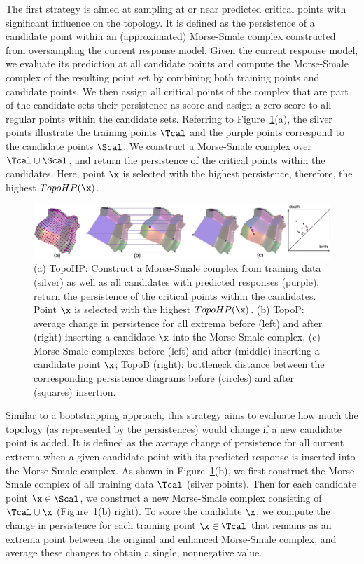  The first strategy is aimed at sampling at or near predicted critical points with significant influence on the topology.
%
It is defined as the persistence of a candidate point within an (approximated) Morse-Smale complex constructed from oversampling the current response model.
%
Given the current response model, we evaluate its prediction at all candidate points and compute the Morse-Smale complex of the resulting point set by combining both training points and candidate points.
%
We then assign all critical points of the complex that are part of the candidate sets their persistence as score and assign a zero score to all regular points within the candidate sets.
%
Referring to Figure~\ref{fig:topo-all}(a), the silver points illustrate the training points $\Tcal$ and the purple points correspond to the candidate points $\Scal$.
%
We construct a Morse-Smale complex over $\Tcal \cup \Scal$, and return the persistence of the critical points within the candidates.
%
Here, point $\x$ is selected with the highest persistence, therefore, the highest $TopoHP(\x)$.

\begin{figure}[!ht]
\begin{center}
\includegraphics[width=1.0\linewidth]{figs/chap5/topo-all}
\caption{(a) TopoHP: Construct a Morse-Smale complex from training data (silver) as well as all candidates with predicted responses (purple), return the persistence of the critical points within the candidates.
%
Point $\protect\x$ is selected with the highest $TopoHP(\protect\x)$.
%
(b) TopoP: average change in persistence for all extrema before (left) and after (right) inserting a candidate $\protect\x$ into the Morse-Smale complex.
%
(c) Morse-Smale complexes before (left) and after (middle) inserting a candidate point $\protect\x$;
%
TopoB (right): bottleneck distance between the corresponding persistence diagrams before (circles) and after (squares) insertion.}
\label{fig:topo-all}
\end{center}
\end{figure}

 Similar to a bootstrapping approach, this strategy aims to evaluate how much the topology (as represented by the persistences) would change if a new candidate point is added.
%
It is defined as the average change of persistence for all current extrema when a given candidate point with its predicted response is inserted into the Morse-Smale complex.
%
As shown in Figure~\ref{fig:topo-all}(b), we first construct the Morse-Smale complex of all training data $\Tcal$ (silver points).
%
Then for each candidate point $\x \in \Scal$, we construct a new Morse-Smale complex consisting of $\Tcal \cup \x$ (Figure~\ref{fig:topo-all}(b) right).
%
To score the candidate $\x$, we compute the change in persistence for each training point $\x \in \Tcal$ that remains as an extrema point between the original and enhanced Morse-Smale complex, and average these changes to obtain a single, nonnegative value.

